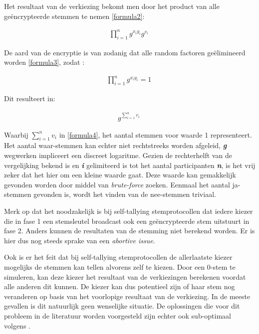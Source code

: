 			Het resultaat van de verkiezing bekomt men door het product van alle geëncrypteerde stemmen te nemen \eqref{formula2}: 	
			\begin{ceqn}
				\begin{align}
				\prod_{i=1}^{n}g^{x_{i}y_{i}}g^{v_{i}} \label{formula2}\
				\end{align}
			\end{ceqn}	
			De aard van de encryptie is van zodanig dat alle random factoren geëlimineerd worden \eqref{formula3}, zodat :	
			\begin{ceqn}
				\begin{align}
				\prod_{i=1}^{n}g^{x_{i}y_{i}} = 1 \label{formula3}\
				\end{align}
			\end{ceqn}
			Dit resulteert in:
			\begin{ceqn}
				\begin{align}
				g^{\sum_{i=1}^{n}v_{i}} \label{formula4}\
				\end{align}
			\end{ceqn}
			Waarbij \textbf{\textit{$\sum_{i=1}^{n}v_{i}$}} in \eqref{formula4}, het aantal stemmen voor waarde 1 representeert. Het aantal waar-stemmen kan echter niet rechtstreeks worden afgeleid, \textbf{\textit{g}}  wegwerken impliceert een discreet logaritme. Gezien de rechterhelft van de vergelijking bekend is en \textbf{\textit{i}} gelimiteerd is tot het aantal participanten \textbf{\textit{n}}, is het vrij zeker dat het hier om een kleine waarde gaat. Deze waarde kan gemakkelijk gevonden worden door middel van \textit{brute-force} zoeken. Eenmaal het aantal ja-stemmen gevonden is, wordt het vinden van de nee-stemmen triviaal.
			
			Merk op dat het noodzakelijk is bij self-tallying stemprotocollen dat iedere kiezer die in fase 1 een stemsleutel broadcast ook een geëncrypteerde stem uitstuurt in fase 2. Anders kunnen de resultaten van de stemming niet berekend worden. Er is hier dus nog steeds sprake van een \textit{abortive issue}.
			
			Ook is er het feit dat bij self-tallying stemprotocollen de allerlaatste kiezer mogelijks de stemmen kan tellen alvorens zelf te kiezen. Door een 0-stem te simuleren, kan deze kiezer het resultaat van de verkiezingen berekenen voordat alle anderen dit kunnen. De kiezer kan dus potentieel zijn of haar stem nog veranderen op basis van het voorlopige resultaat van de verkiezing. In de meeste gevallen is dit natuurlijk geen wenselijke situatie. De oplossingen die voor dit probleem in de literatuur worden voorgesteld zijn echter ook sub-optimaal volgens \textcite{McCorry2017}. 
			
